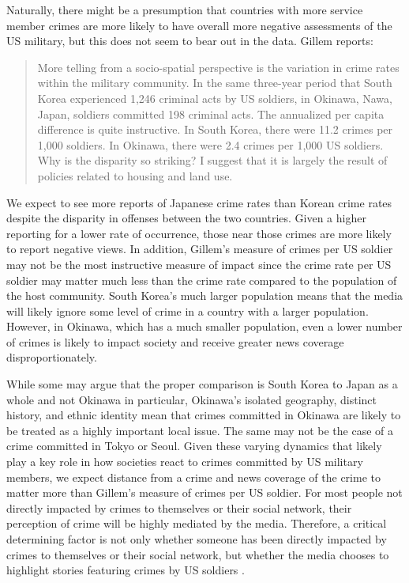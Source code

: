 Naturally, there might be a presumption that countries with more service member crimes are more likely to have overall more negative assessments of the US military, but this does not seem to bear out in the data. Gillem reports: 

\begin{quote}
	More telling from a socio-spatial perspective is the variation in crime rates within the military community. In the same three-year period that South Korea experienced 1,246 criminal acts by US soldiers, in Okinawa, Nawa, Japan, soldiers committed 198 criminal acts. The annualized per capita difference is quite instructive. In South Korea, there were 11.2 crimes per 1,000 soldiers. In Okinawa, there were 2.4 crimes per 1,000 US soldiers. Why is the disparity so striking? I suggest that it is largely the result of policies related to housing and land use.\cite[p.48]{Gillem2007}
\end{quote}
We expect to see more reports of Japanese crime rates than Korean crime rates despite the disparity in offenses between the two countries. Given a higher reporting for a lower rate of occurrence, those near those crimes are more likely to report negative views. In addition, Gillem's measure of crimes per US soldier may not be the most instructive measure of impact since the crime rate per US soldier may matter much less than the crime rate compared to the population of the host community. South Korea's much larger population means that the media will likely ignore some level of crime in a country with a larger population. However, in Okinawa, which has a much smaller population, even a lower number of crimes is likely to impact society and receive greater news coverage disproportionately. 

While some may argue that the proper comparison is South Korea to Japan as a whole and not Okinawa in particular, Okinawa's isolated geography, distinct history, and ethnic identity mean that crimes committed in Okinawa are likely to be treated as a highly important local issue. The same may not be the case of a crime committed in Tokyo or Seoul. Given these varying dynamics that likely play a key role in how societies react to crimes committed by US military members, we expect distance from a crime and news coverage of the crime to matter more than Gillem's measure of crimes per US soldier. For most people not directly impacted by crimes to themselves or their social network, their perception of crime will be highly mediated by the media. Therefore, a critical determining factor is not only whether someone has been directly impacted by crimes to themselves or their social network, but whether the media chooses to highlight stories featuring crimes by US soldiers \cite{Song2004}.

